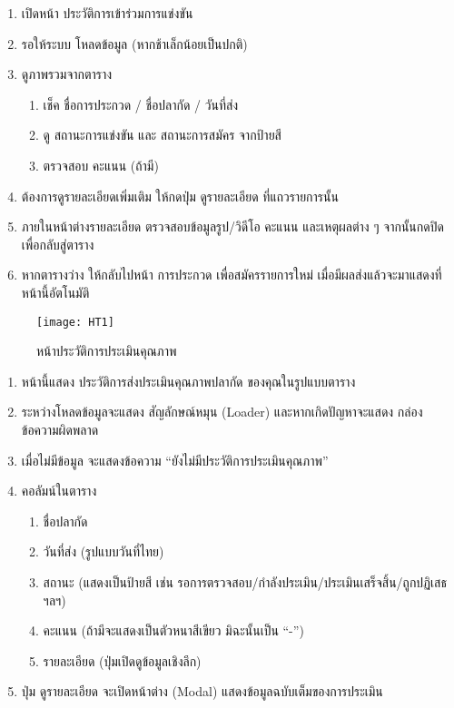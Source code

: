 \par

\begin{sloppypar}
	\begin{enumerate}
		\item เปิดหน้า ประวัติการเข้าร่วมการแข่งขัน
		\item รอให้ระบบ โหลดข้อมูล (หากช้าเล็กน้อยเป็นปกติ)
		\item ดูภาพรวมจากตาราง
		\begin{enumerate}
			\item เช็ค ชื่อการประกวด / ชื่อปลากัด / วันที่ส่ง
			\item ดู สถานะการแข่งขัน และ สถานะการสมัคร จากป้ายสี
			\item ตรวจสอบ คะแนน (ถ้ามี)
		\end{enumerate}
		\item ต้องการดูรายละเอียดเพิ่มเติม ให้กดปุ่ม ดูรายละเอียด ที่แถวรายการนั้น
		\item ภายในหน้าต่างรายละเอียด ตรวจสอบข้อมูลรูป/วิดีโอ คะแนน และเหตุผลต่าง ๆ จากนั้นกดปิดเพื่อกลับสู่ตาราง
		\item หากตารางว่าง ให้กลับไปหน้า การประกวด เพื่อสมัครรายการใหม่ เมื่อมีผลส่งแล้วจะมาแสดงที่หน้านี้อัตโนมัติ
	\end{enumerate}
\end{sloppypar}

\begin{figure}[h]
	\centering
	\texttt{[image: HT1]}
	\caption{หน้าประวัติการประเมินคุณภาพ}
\end{figure}

\par

\begin{sloppypar}
	\begin{enumerate}
		\item หน้านี้แสดง ประวัติการส่งประเมินคุณภาพปลากัด ของคุณในรูปแบบตาราง
		\item ระหว่างโหลดข้อมูลจะแสดง สัญลักษณ์หมุน (Loader) และหากเกิดปัญหาจะแสดง กล่องข้อความผิดพลาด
		\item เมื่อไม่มีข้อมูล จะแสดงข้อความ “ยังไม่มีประวัติการประเมินคุณภาพ”
		\item คอลัมน์ในตาราง
		\begin{enumerate}
			\item ชื่อปลากัด
			\item วันที่ส่ง (รูปแบบวันที่ไทย)
			\item สถานะ (แสดงเป็นป้ายสี เช่น รอการตรวจสอบ/กำลังประเมิน/ประเมินเสร็จสิ้น/ถูกปฏิเสธ ฯลฯ)
			\item คะแนน (ถ้ามีจะแสดงเป็นตัวหนาสีเขียว มิฉะนั้นเป็น “-”)
			\item รายละเอียด (ปุ่มเปิดดูข้อมูลเชิงลึก)
		\end{enumerate}
		\item ปุ่ม ดูรายละเอียด จะเปิดหน้าต่าง (Modal) แสดงข้อมูลฉบับเต็มของการประเมิน
	\end{enumerate}
\end{sloppypar}

